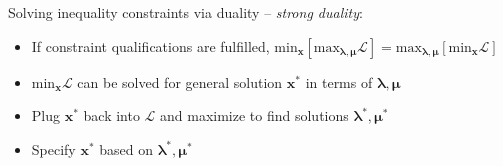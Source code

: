 Solving inequality constraints via duality – \emph{strong duality}:
\begin{itemize}
    \item If constraint qualifications are fulfilled, $\textrm{min}_{\boldsymbol{x}} [\textrm{max}_{\boldsymbol{\lambda},\boldsymbol{\mu}} \mathcal{L}] = \textrm{max}_{\boldsymbol{\lambda},\boldsymbol{\mu}} [\textrm{min}_{\boldsymbol{x}} \mathcal{L}]$
    \item $\textrm{min}_{\boldsymbol{x}} \mathcal{L}$ can be solved for general solution $\boldsymbol{x^*}$ in terms of $\boldsymbol{\lambda},\boldsymbol{\mu}$
    \item Plug $\boldsymbol{x^*}$ back into $\mathcal{L}$ and maximize to find solutions $\boldsymbol{\lambda^*},\boldsymbol{\mu^*}$
    \item Specify $\boldsymbol{x^*}$ based on $\boldsymbol{\lambda^*},\boldsymbol{\mu^*}$
\end{itemize}
